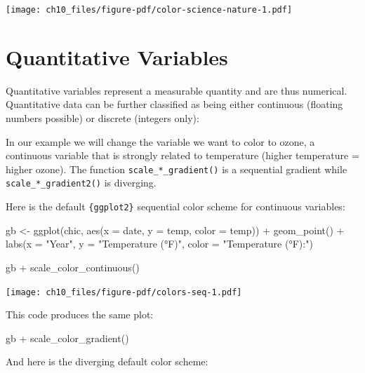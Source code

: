 \documentclass[
  letterpaper,
]{scrbook}
\newenvironment{Shaded}{\begin{snugshade}}{\end{snugshade}}
\newcommand{\AttributeTok}[1]{\textcolor[rgb]{0.40,0.45,0.13}{#1}}
\newcommand{\FunctionTok}[1]{\textcolor[rgb]{0.28,0.35,0.67}{#1}}
\newcommand{\NormalTok}[1]{\textcolor[rgb]{0.00,0.23,0.31}{#1}}
\newcommand{\OtherTok}[1]{\textcolor[rgb]{0.00,0.23,0.31}{#1}}
\newcommand{\SpecialCharTok}[1]{\textcolor[rgb]{0.37,0.37,0.37}{#1}}
\newcommand{\StringTok}[1]{\textcolor[rgb]{0.13,0.47,0.30}{#1}}
\begin{document}
\texttt{[image: ch10\_files/figure-pdf/color-science-nature-1.pdf]}

\section{Quantitative Variables}\label{quantitative-variables}

Quantitative variables represent a measurable quantity and are thus
numerical. Quantitative data can be further classified as being either
continuous (floating numbers possible) or discrete (integers only):

In our example we will change the variable we want to color to ozone, a
continuous variable that is strongly related to temperature (higher
temperature = higher ozone). The function \texttt{scale\_*\_gradient()}
is a sequential gradient while \texttt{scale\_*\_gradient2()} is
diverging.

Here is the default \texttt{\{ggplot2\}} sequential color scheme for
continuous variables:

\begin{Shaded}
\begin{Highlighting}[]
\NormalTok{gb }\OtherTok{\textless{}{-}} \FunctionTok{ggplot}\NormalTok{(chic, }\FunctionTok{aes}\NormalTok{(}\AttributeTok{x =}\NormalTok{ date, }\AttributeTok{y =}\NormalTok{ temp, }\AttributeTok{color =}\NormalTok{ temp)) }\SpecialCharTok{+}
  \FunctionTok{geom\_point}\NormalTok{() }\SpecialCharTok{+}
  \FunctionTok{labs}\NormalTok{(}\AttributeTok{x =} \StringTok{"Year"}\NormalTok{, }\AttributeTok{y =} \StringTok{"Temperature (°F)"}\NormalTok{, }\AttributeTok{color =} \StringTok{"Temperature (°F):"}\NormalTok{)}

\NormalTok{gb }\SpecialCharTok{+} \FunctionTok{scale\_color\_continuous}\NormalTok{()}
\end{Highlighting}
\end{Shaded}

\texttt{[image: ch10\_files/figure-pdf/colors-seq-1.pdf]}

This code produces the same plot:

\begin{Shaded}
\begin{Highlighting}[]
\NormalTok{gb }\SpecialCharTok{+} \FunctionTok{scale\_color\_gradient}\NormalTok{()}
\end{Highlighting}
\end{Shaded}

And here is the diverging default color scheme:
\end{document}
